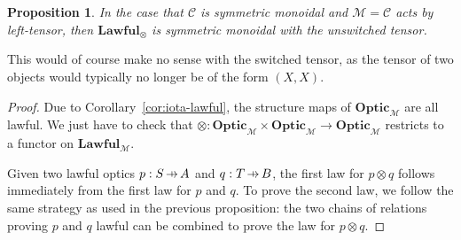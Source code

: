 \documentclass[11pt,letterpaper]{article}
\theoremstyle{plain}
\newtheorem{proposition}[theorem]{Proposition}
\theoremstyle{definition}
\newcommand{\C}{\mathscr{C}}
\newcommand{\M}{\mathscr{M}}
\newcommand{\Optic}{\mathbf{Optic}}
\newcommand{\Lawful}{\mathbf{Lawful}}
\newcommand{\hto}{\ensuremath{\,\mathaccent\shortmid\rightarrow\,}}
\begin{document}
\begin{proposition}
  In the case that $\C$ is symmetric monoidal and $\M = \C$ acts by left-tensor, then $\Lawful_\otimes$ is symmetric monoidal with the unswitched tensor.
\end{proposition}
This would of course make no sense with the switched tensor, as the tensor of two objects would typically no longer be of the form $(X, X)$.
\begin{proof}
Due to Corollary~\ref{cor:iota-lawful}, the structure maps of $\Optic_\M$ are all lawful. We just have to check that $\otimes : \Optic_\M \times \Optic_\M \to \Optic_\M$ restricts to a functor on $\Lawful_\M$. 

Given two lawful optics $p : S \hto A$ and $q : T \hto B$, the first law for $p \otimes q$ follows immediately from the first law for $p$ and $q$. To prove the second law, we follow the same strategy as used in the previous proposition: the two chains of relations proving $p$ and $q$  lawful can be combined to prove the law for $p \otimes q$.


\end{proof}
\end{document}
